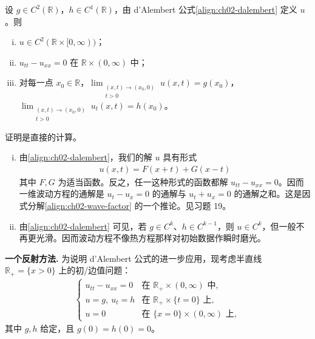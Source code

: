 \documentclass[../../main.tex]{subfiles}
\begin{document}
\begin{theorem}[波动方程的解，$n=1$]\label{theorem:ch02-wave-1d}设 $g\in C^2(\mathbb{R})$，$h\in C^1(\mathbb{R})$，由 d'Alembert 公式\eqref{align:ch02-dalembert} 定义 $u$。则
\begin{enumerate}[(i)]
\item $u\in C^2(\mathbb{R}\times[0,\infty))$；
\item $u_{tt}-u_{xx}=0$ 在 $\mathbb{R}\times(0,\infty)$ 中；
\item 对每一点 $x_0\in\mathbb{R}$，$\displaystyle\lim_{\substack{(x,t)\to(x_0,0)\\t>0}}u(x,t)=g(x_0)$，$\displaystyle\lim_{\substack{(x,t)\to(x_0,0)\\t>0}}u_t(x,t)=h(x_0)$。
\end{enumerate}
\end{theorem}

证明是直接的计算。

\begin{remark}\label{remark:ch02-wave-1d}
\begin{enumerate}[(i)]
\item 由\eqref{align:ch02-dalembert}，我们的解 $u$ 具有形式
\begin{align*}
u(x,t)=F(x+t)+G(x-t)
\end{align*}
其中 $F,G$ 为适当函数。反之，任一这种形式的函数都解 $u_{tt}-u_{xx}=0$。因而一维波动方程的通解是 $u_t-u_x=0$ 的通解与 $u_t+u_x=0$ 的通解之和。这是因式分解\eqref{align:ch02-wave-factor} 的一个推论。见习题 19。
\item 由\eqref{align:ch02-dalembert} 可见，若 $g\in C^k$、$h\in C^{k-1}$，则 $u\in C^k$，但一般不再更光滑。因而波动方程不像热方程那样对初始数据作瞬时磨光。
\end{enumerate}
\end{remark}

\textbf{一个反射方法.} 为说明 d'Alembert 公式的进一步应用，现考虑半直线 $\mathbb{R}_+=\{x>0\}$ 上的初/边值问题：
\begin{align}\label{align:ch02-wave-halfline}
\begin{cases}
u_{tt}-u_{xx}=0 & \text{在 }\mathbb{R}_+\times(0,\infty)\text{ 中},\\
u=g,\ u_t=h & \text{在 }\mathbb{R}_+\times\{t=0\}\text{ 上},\\
u=0 & \text{在 }\{x=0\}\times(0,\infty)\text{ 上},
\end{cases}
\end{align}
其中 $g,h$ 给定，且 $g(0)=h(0)=0$。
\end{document}
